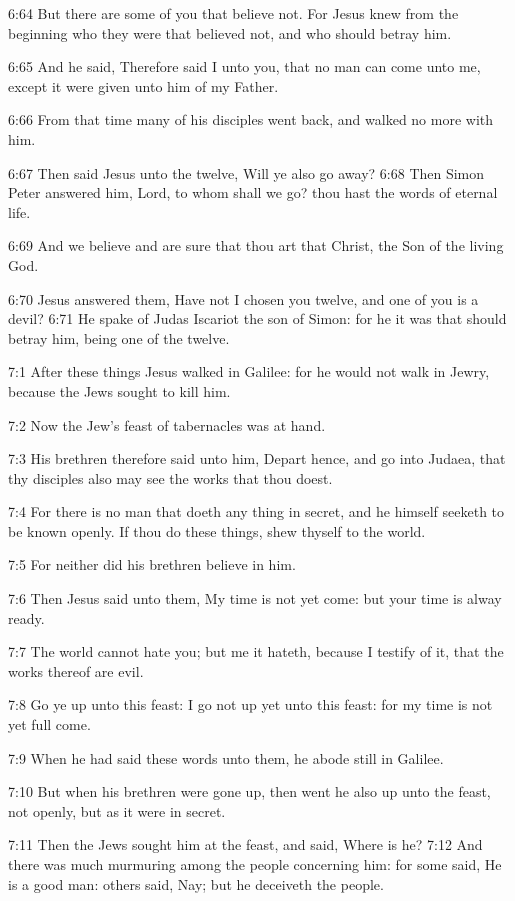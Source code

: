 6:64 But there are some of you that believe not. For Jesus knew from the beginning who they were that believed not, and who should betray him.

6:65 And he said, Therefore said I unto you, that no man can come unto me, except it were given unto him of my Father.

6:66 From that time many of his disciples went back, and walked no more with him.

6:67 Then said Jesus unto the twelve, Will ye also go away?  6:68 Then Simon Peter answered him, Lord, to whom shall we go? thou hast the words of eternal life.

6:69 And we believe and are sure that thou art that Christ, the Son of the living God.

6:70 Jesus answered them, Have not I chosen you twelve, and one of you is a devil?  6:71 He spake of Judas Iscariot the son of Simon: for he it was that should betray him, being one of the twelve.

7:1 After these things Jesus walked in Galilee: for he would not walk in Jewry, because the Jews sought to kill him.

7:2 Now the Jew's feast of tabernacles was at hand.

7:3 His brethren therefore said unto him, Depart hence, and go into Judaea, that thy disciples also may see the works that thou doest.

7:4 For there is no man that doeth any thing in secret, and he himself seeketh to be known openly. If thou do these things, shew thyself to the world.

7:5 For neither did his brethren believe in him.

7:6 Then Jesus said unto them, My time is not yet come: but your time is alway ready.

7:7 The world cannot hate you; but me it hateth, because I testify of it, that the works thereof are evil.

7:8 Go ye up unto this feast: I go not up yet unto this feast: for my time is not yet full come.

7:9 When he had said these words unto them, he abode still in Galilee.

7:10 But when his brethren were gone up, then went he also up unto the feast, not openly, but as it were in secret.

7:11 Then the Jews sought him at the feast, and said, Where is he?  7:12 And there was much murmuring among the people concerning him: for some said, He is a good man: others said, Nay; but he deceiveth the people.

